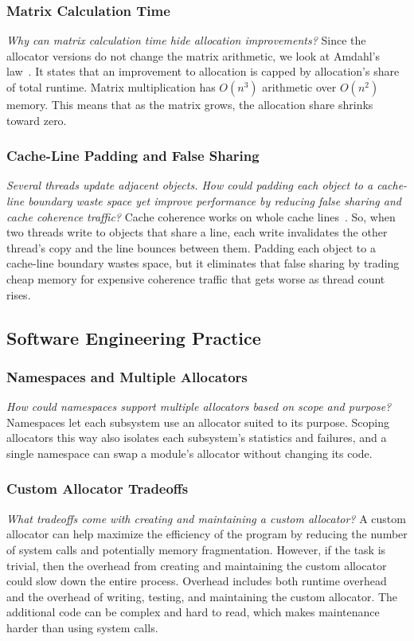 \subsubsection{Matrix Calculation Time}
\emph{Why can matrix calculation time hide allocation improvements?}
Since the allocator versions do not change the matrix arithmetic, we look at
Amdahl's law~\cite{amdahl1967}.
It states that an improvement to allocation is capped by allocation's share of
total runtime.
Matrix multiplication has $O(n^3)$ arithmetic over $O(n^2)$ memory.
This means that as the matrix grows, the allocation share shrinks toward zero.

\subsubsection{Cache-Line Padding and False Sharing}
\emph{Several threads update adjacent objects. How could padding each object
to a cache-line boundary waste space yet improve performance by reducing false
sharing and cache coherence traffic?}
Cache coherence works on whole cache lines~\cite{hennessy2019}.
So, when two threads write to objects that share a line, each write
invalidates the other thread's copy and the line bounces between them.
Padding each object to a cache-line boundary wastes space, but it eliminates
that false sharing by trading cheap memory for expensive coherence traffic that
gets worse as thread count rises.

\subsection{Software Engineering Practice}
\label{sec:rq-engineering}

\subsubsection{Namespaces and Multiple Allocators}
\emph{How could namespaces support multiple allocators based on scope and
purpose?}
Namespaces let each subsystem use an allocator suited to its purpose.
Scoping allocators this way also isolates each subsystem's statistics and
failures, and a single namespace can swap a module's allocator without
changing its code.

\subsubsection{Custom Allocator Tradeoffs}
\emph{What tradeoffs come with creating and maintaining a custom allocator?}
A custom allocator can help maximize the efficiency of the program by reducing
the number of system calls and potentially memory fragmentation.
However, if the task is trivial, then the overhead from creating and
maintaining the custom allocator could slow down the entire process.
Overhead includes both runtime overhead and the overhead of writing, testing,
and maintaining the custom allocator.
The additional code can be complex and hard to read, which makes maintenance
harder than using system calls.

